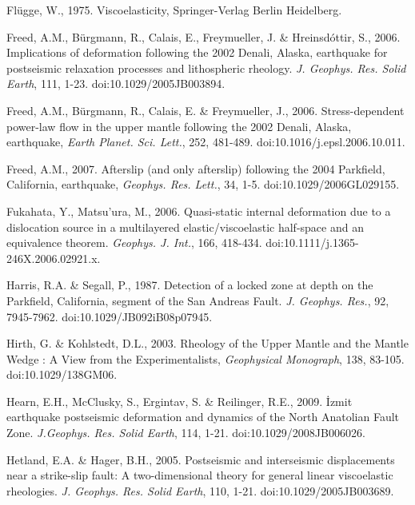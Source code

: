 \documentclass[extra]{gji}
\begin{document}
\begin{thebibliography}{}
 Fl\"ugge,
  W., 1975. Viscoelasticity, Springer-Verlag Berlin Heidelberg.

 Freed, A.M., B\"urgmann,
  R., Calais, E., Freymueller, J. \& Hreinsd\'ottir, S.,
  2006. Implications of deformation following the 2002 Denali, Alaska,
  earthquake for postseismic relaxation processes and lithospheric
  rheology. \textit{J. Geophys. Res. Solid Earth}, 111,
  1-23. doi:10.1029/2005JB003894.

 Freed, A.M.,
  B\"urgmann, R., Calais, E. \& Freymueller, J.,
  2006. Stress-dependent power-law flow in the upper mantle following
  the 2002 Denali, Alaska, earthquake, \textit{Earth
    Planet. Sci. Lett.}, 252, 481-489. doi:10.1016/j.epsl.2006.10.011.

 Freed, A.M., 2007. Afterslip
  (and only afterslip) following the 2004 Parkfield, California,
  earthquake, \textit{Geophys. Res. Lett.}, 34,
  1-5. doi:10.1029/2006GL029155.

 Fukahata, Y.,
  Matsu’ura, M., 2006. Quasi-static internal deformation due to a
  dislocation source in a multilayered elastic/viscoelastic half-space
  and an equivalence theorem. \textit{Geophys. J. Int.}, 166,
  418-434. doi:10.1111/j.1365-246X.2006.02921.x.

 Harris, R.A. \&
  Segall, P., 1987. Detection of a locked zone at depth on the
  Parkfield, California, segment of the San Andreas
  Fault. \textit{J. Geophys. Res.}, 92,
  7945-7962. doi:10.1029/JB092iB08p07945.

 Hirth, G. \& Kohlstedt,
  D.L., 2003. Rheology of the Upper Mantle and the Mantle Wedge : A
  View from the Experimentalists, \textit{Geophysical Monograph}, 138,
  83-105. doi:10.1029/138GM06.

 Hearn, E.H., McClusky, S.,
  Ergintav, S. \& Reilinger, R.E., 2009. \.Izmit earthquake
  postseismic deformation and dynamics of the North Anatolian Fault
  Zone. \textit{J.Geophys. Res. Solid Earth}, 114,
  1-21. doi:10.1029/2008JB006026.

 Hetland, E.A. \& Hager,
  B.H., 2005. Postseismic and interseismic displacements near a
  strike-slip fault: A two-dimensional theory for general linear
  viscoelastic rheologies. \textit{J. Geophys. Res. Solid Earth}, 110,
  1-21. doi:10.1029/2005JB003689.


\end{thebibliography}
\end{document}
